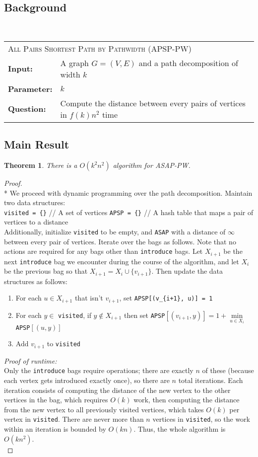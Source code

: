 \documentclass{article}
\newcommand{\problem}[1]{\textsc{#1}}
\newtheorem{theorem}{Theorem}
\newcommand{\defproblem}[4]{%
  \hfill\\\smallskip\noindent%
  \begin{tabularx}{\textwidth}{|l X|}%
    \hline%
    \multicolumn{2}{|l|}{\problem{#1}}\\%
    \textbf{Input:}&#2\\%
    \textbf{Parameter:}&#3\\%
    \textbf{Question:}&#4\smallskip\\\hline%
  \end{tabularx}%
  \smallskip%
}%
\newcommand{\proofnewline}{\mbox{}\\*}
\begin{document}
\subsection*{Background}
\defproblem{All Pairs Shortest Path by Pathwidth (APSP-PW)}
{A graph $G = (V,E)$ and a path decomposition of width $k$}
{$k$}
{Compute the distance between every pairs of vertices in $f(k) n^2$ time}

\subsection*{Main Result}
\begin{theorem}
There is a $O(k^2 n^2)$ algorithm for \textsc{ASAP-PW}.
\end{theorem}

\begin{proof}
\proofnewline
We proceed with dynamic programming over the path decomposition. Maintain two data structures:\\

\noindent \verb|visited = {}| // A set of vertices\newline
\noindent \verb|APSP = {}| // A hash table that maps a pair of vertices to a distance\\

\noindent Additionally, initialize \verb|visited| to be empty, and \verb|ASAP| with a distance of $\infty$ between every pair of vertices. Iterate over the bags as follows.
Note that no actions are required for any bags other than \texttt{introduce} bags. Let $X_{i+1}$ be the next \texttt{introduce} bag we encounter during the course of the algorithm, and let $X_i$ be the previous bag so that $X_{i+1} = X_i \cup \{v_{i+1}\}$.
Then update the data structures as follows:
\begin{enumerate}
\item For each $u \in X_{i+1}$ that isn't $v_{i+1}$, set \verb|APSP[(v_{i+1}, u)] = 1|
\item For each $y \in$ \verb|visited|, if $y \notin X_{i+1}$ then set \verb|APSP|$[(v_{i+1},y)] = 1 + \min\limits_{u \in X_i}$ \verb|APSP|$[(u, y)]$
\item Add $v_{i+1}$ to \verb|visited|
\end{enumerate}

\noindent \emph{Proof of runtime:}\\
Only the \texttt{introduce} bags require operations; there are exactly $n$ of these (because each vertex gets introduced exactly once), so there are $n$ total iterations.
Each iteration consists of computing the distance of the new vertex to the other vertices in the bag, which requires $O(k)$ work, then computing the distance from the new vertex to all previously visited vertices, which takes $O(k)$ per vertex in \texttt{visited}.
There are never more than $n$ vertices in \texttt{visited}, so the work within an iteration is bounded by $O(kn)$.
Thus, the whole algorithm is $O(k n^2)$.\\


\end{proof}
\end{document}
